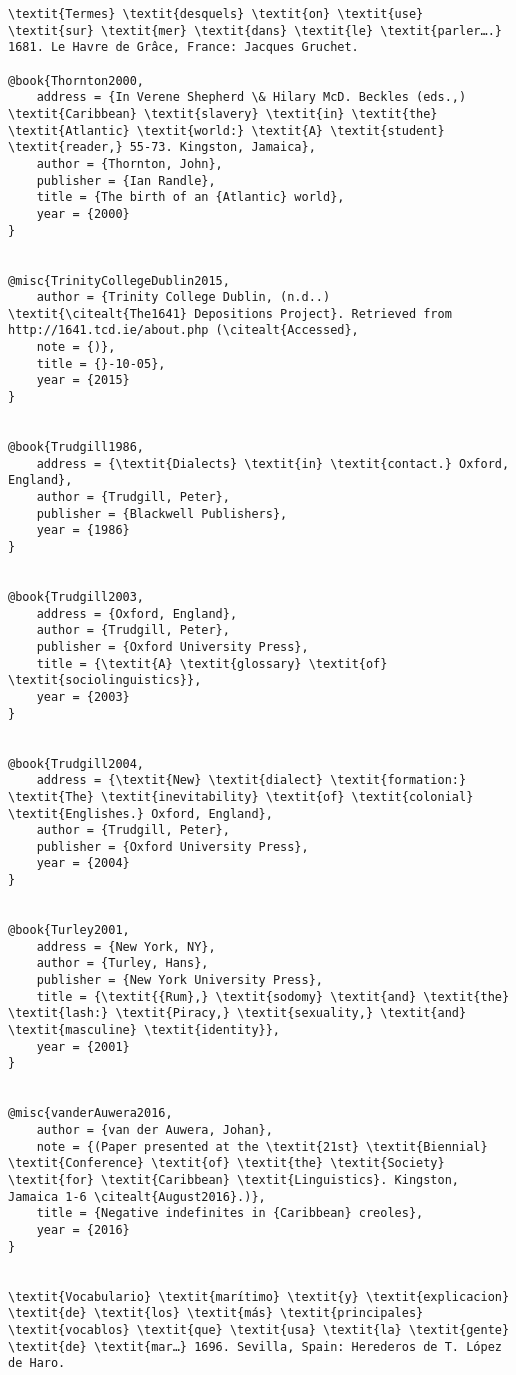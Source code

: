 \begin{verbatim}
\textit{Termes} \textit{desquels} \textit{on} \textit{use} \textit{sur} \textit{mer} \textit{dans} \textit{le} \textit{parler….} 1681. Le Havre de Grâce, France: Jacques Gruchet.

@book{Thornton2000,
	address = {In Verene Shepherd \& Hilary McD. Beckles (eds.,) \textit{Caribbean} \textit{slavery} \textit{in} \textit{the} \textit{Atlantic} \textit{world:} \textit{A} \textit{student} \textit{reader,} 55-73. Kingston, Jamaica},
	author = {Thornton, John},
	publisher = {Ian Randle},
	title = {The birth of an {Atlantic} world},
	year = {2000}
}


@misc{TrinityCollegeDublin2015,
	author = {Trinity College Dublin, (n.d..) \textit{\citealt{The1641} Depositions Project}. Retrieved from http://1641.tcd.ie/about.php (\citealt{Accessed},
	note = {)},
	title = {}-10-05},
	year = {2015}
}


@book{Trudgill1986,
	address = {\textit{Dialects} \textit{in} \textit{contact.} Oxford, England},
	author = {Trudgill, Peter},
	publisher = {Blackwell Publishers},
	year = {1986}
}


@book{Trudgill2003,
	address = {Oxford, England},
	author = {Trudgill, Peter},
	publisher = {Oxford University Press},
	title = {\textit{A} \textit{glossary} \textit{of} \textit{sociolinguistics}},
	year = {2003}
}


@book{Trudgill2004,
	address = {\textit{New} \textit{dialect} \textit{formation:} \textit{The} \textit{inevitability} \textit{of} \textit{colonial} \textit{Englishes.} Oxford, England},
	author = {Trudgill, Peter},
	publisher = {Oxford University Press},
	year = {2004}
}


@book{Turley2001,
	address = {New York, NY},
	author = {Turley, Hans},
	publisher = {New York University Press},
	title = {\textit{{Rum},} \textit{sodomy} \textit{and} \textit{the} \textit{lash:} \textit{Piracy,} \textit{sexuality,} \textit{and} \textit{masculine} \textit{identity}},
	year = {2001}
}


@misc{vanderAuwera2016,
	author = {van der Auwera, Johan},
	note = {(Paper presented at the \textit{21st} \textit{Biennial} \textit{Conference} \textit{of} \textit{the} \textit{Society} \textit{for} \textit{Caribbean} \textit{Linguistics}. Kingston, Jamaica 1-6 \citealt{August2016}.)},
	title = {Negative indefinites in {Caribbean} creoles},
	year = {2016}
}


\textit{Vocabulario} \textit{marítimo} \textit{y} \textit{explicacion} \textit{de} \textit{los} \textit{más} \textit{principales} \textit{vocablos} \textit{que} \textit{usa} \textit{la} \textit{gente} \textit{de} \textit{mar…} 1696. Sevilla, Spain: Herederos de T. López de Haro.


\end{verbatim}
